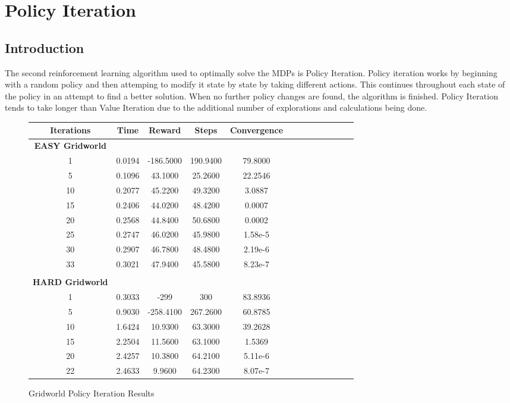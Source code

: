 \documentclass[h]{article}
\begin{document}
 
\section*{Policy Iteration}
\subsection*{Introduction}
The second reinforcement learning algorithm used to optimally solve the MDPs is 
Policy Iteration.  Policy iteration works by beginning with a random policy and then 
attemping to modify it state by state by taking different actions.  This continues throughout each state of the policy in an attempt
 to find a better solution.  When no further policy changes are found, the algorithm 
 is finished.  Policy Iteration tends to take longer than Value Iteration due to 
 the additional number of explorations and calculations being done.
 
  \begin{figure}[H] 
\centering
\begin{tabular}{ | c | c  | c | c | c | c | c | c| c| c| c| c| c | } 
\hline
\textbf{Iterations} & \textbf{Time} & \textbf{Reward} & \textbf{Steps} & \textbf{Convergence}   \\
\hline
\textbf{EASY Gridworld} \\ \hline
1 & 0.0194 & -186.5000 & 190.9400 & 79.8000 \\ \hline
5 & 0.1096 & 43.1000 & 25.2600 & 22.2546 \\ \hline
10 & 0.2077 & 45.2200 & 49.3200 & 3.0887 \\ \hline
15 & 0.2406 & 44.0200 & 48.4200 & 0.0007 \\ \hline
20 & 0.2568 & 44.8400 & 50.6800 & 0.0002 \\ \hline
25 & 0.2747 & 46.0200 & 45.9800 & 1.58e-5 \\ \hline
30 & 0.2907 & 46.7800 & 48.4800 & 2.19e-6 \\ \hline
33 & 0.3021 & 47.9400 & 45.5800 & 8.23e-7 \\ \hline
\\
\textbf{HARD Gridworld} \\ \hline
1 & 0.3033 & -299 & 300 & 83.8936 \\ \hline
5 & 0.9030 & -258.4100 & 267.2600 & 60.8785 \\ \hline
10 & 1.6424 & 10.9300 & 63.3000 & 39.2628 \\ \hline
15 & 2.2504 & 11.5600 & 63.1000 & 1.5369 \\ \hline
20 & 2.4257 & 10.3800 & 64.2100 & 5.11e-6 \\ \hline
22 & 2.4633 & 9.9600 & 64.2300 & 8.07e-7 \\ \hline

\end{tabular}
\caption*{Gridworld Policy Iteration Results} 
\end{figure}
 
\end{document}
